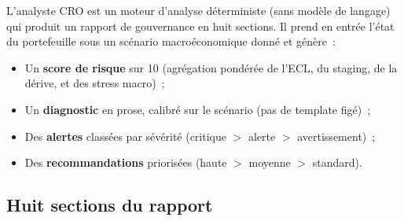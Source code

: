 \documentclass[12pt, a4paper, twoside, openright]{report}
\theoremstyle{definition}
\begin{document}
L'analyste CRO est un moteur d'analyse déterministe (sans modèle de langage) qui produit un rapport de gouvernance en huit sections. Il prend en entrée l'état du portefeuille sous un scénario macroéconomique donné et génère~:

\begin{itemize}[nosep]
  \item Un \textbf{score de risque} sur 10 (agrégation pondérée de l'ECL, du staging, de la dérive, et des stress macro)~;
  \item Un \textbf{diagnostic} en prose, calibré sur le scénario (pas de template figé)~;
  \item Des \textbf{alertes} classées par sévérité (critique $>$ alerte $>$ avertissement)~;
  \item Des \textbf{recommandations} priorisées (haute $>$ moyenne $>$ standard).
\end{itemize}

\subsection{Huit sections du rapport}
\end{document}
